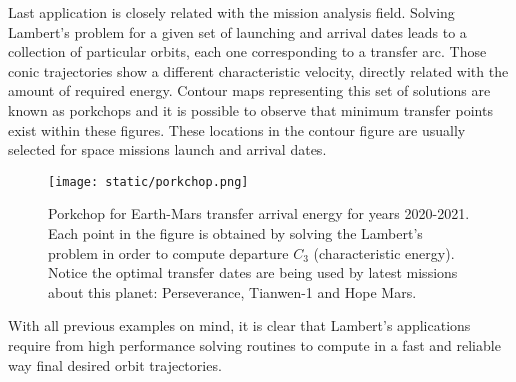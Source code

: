 Last application is closely related with the mission analysis field. Solving
Lambert's problem for a given set of launching and arrival dates leads to a
collection of particular orbits, each one corresponding to a transfer arc.
Those conic trajectories show a different characteristic velocity, directly
related with the amount of required energy.  Contour maps representing this set
of solutions are known as porkchops and it is possible to observe that minimum
transfer points exist within these figures.  These locations in the contour
figure are usually selected for space missions launch and arrival dates.

\begin{figure}[h]
  \centering
  \texttt{[image: static/porkchop.png]}
  \caption{Porkchop for Earth-Mars transfer arrival energy for years 2020-2021.
    Each point in the figure is obtained by solving the Lambert's problem in order
    to compute departure $C_{3}$ (characteristic energy). Notice the optimal
    transfer dates are being used by latest missions about this planet: Perseverance,
    Tianwen-1 and Hope Mars.}
  \label{fig:porkchop_perseverance}
\end{figure}

With all previous examples on mind, it is clear that Lambert's applications
require from high performance solving routines to compute in a fast and reliable
way final desired orbit trajectories.
